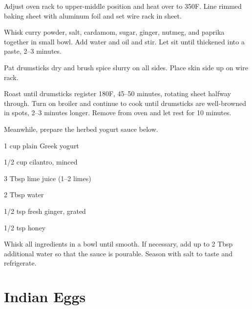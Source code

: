 \documentclass[oneside]{book}  %
\def\thisrecipe{}  %
\newcommand{\recipe}[1]{\section{#1}\def\thisrecipe{: #1}} %
\newcommand{\degF}{\textdegree F\xspace}
\begin{document}
\begin{directions}
  \item Adjust oven rack to upper-middle position and heat over to 350\degF.
    Line rimmed baking sheet with aluminum foil and set wire rack in sheet.

  \item Whisk curry powder, salt, cardamom, sugar, ginger, nutmeg, and paprika
    together in small bowl. Add water and oil and stir. Let sit until thickened
    into a paste, 2--3 minutes.

  \item Pat drumsticks dry and brush spice slurry on all sides. Place skin side
    up on wire rack.

  \columnbreak

  \item Roast until drumsticks register 180\degF, 45--50 minutes, rotating
    sheet halfway through. Turn on broiler and continue to cook until drumsticks
    are well-browned in spots, 2--3 minutes longer. Remove from oven and let
    rest for 10 minutes.

  \item Meanwhile, prepare the herbed yogurt sauce below.
\end{directions}

\smallskip

\begin{twocols}
  \begin{ingredients}
    \item[1 cup] plain Greek yogurt
    \item[1/2 cup] cilantro, minced
    \item[3 Tbsp] lime juice (1--2 limes)
    \item[2 Tbsp] water
    \item[1/2 tsp] fresh ginger, grated
    \item[1/2 tsp] honey
  \end{ingredients}

  \columnbreak

  \begin{directions1col}
  \item Whisk all ingredients in a bowl until smooth. If necessary, add up to 2
    Tbsp additional water so that the sauce is pourable. Season with salt to
    taste and refrigerate.
  \end{directions1col}
\end{twocols}
\recipe{Indian Eggs} \label{recipe:indian_eggs} %
\end{document}
